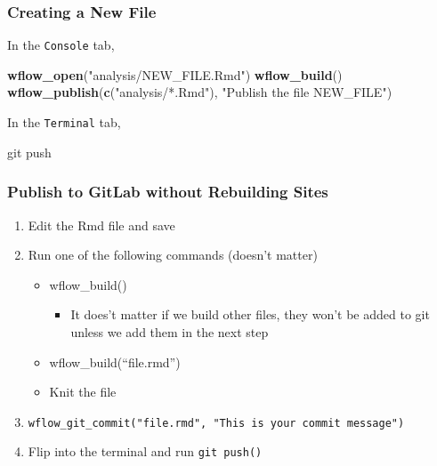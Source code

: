 \documentclass[]{book}
\newenvironment{Shaded}{\begin{snugshade}}{\end{snugshade}}
\newcommand{\KeywordTok}[1]{\textcolor[rgb]{0.13,0.29,0.53}{\textbf{#1}}}
\newcommand{\NormalTok}[1]{#1}
\newcommand{\StringTok}[1]{\textcolor[rgb]{0.31,0.60,0.02}{#1}}
\providecommand{\tightlist}{%
  \setlength{\itemsep}{0pt}\setlength{\parskip}{0pt}}
\begin{document}
\hypertarget{creating-a-new-file}{%
\subsubsection{Creating a New File}\label{creating-a-new-file}}

In the \texttt{Console} tab,

\begin{Shaded}
\begin{Highlighting}[]
\KeywordTok{wflow_open}\NormalTok{(}\StringTok{"analysis/NEW_FILE.Rmd"}\NormalTok{)}
\KeywordTok{wflow_build}\NormalTok{()}
\KeywordTok{wflow_publish}\NormalTok{(}\KeywordTok{c}\NormalTok{(}\StringTok{"analysis/*.Rmd"}\NormalTok{), }\StringTok{"Publish the file NEW_FILE"}\NormalTok{)}
\end{Highlighting}
\end{Shaded}

In the \texttt{Terminal} tab,

\begin{Shaded}
\begin{Highlighting}[]
\NormalTok{git push}
\end{Highlighting}
\end{Shaded}

\hypertarget{publish-to-gitlab-without-rebuilding-sites}{%
\subsubsection{Publish to GitLab without Rebuilding Sites}\label{publish-to-gitlab-without-rebuilding-sites}}

\begin{enumerate}
\def\labelenumi{\arabic{enumi}.}
\tightlist
\item
  Edit the Rmd file and save
\item
  Run one of the following commands (doesn't matter)

  \begin{itemize}
  \tightlist
  \item
    wflow\_build()

    \begin{itemize}
    \tightlist
    \item
      It does't matter if we build other files, they won't be added to git unless we add them in the next step
    \end{itemize}
  \item
    wflow\_build(``file.rmd'')
  \item
    Knit the file
  \end{itemize}
\item
  \texttt{wflow\_git\_commit("file.rmd",\ "This\ is\ your\ commit\ message")}
\item
  Flip into the terminal and run \texttt{git\ push()}
\end{enumerate}
\end{document}
